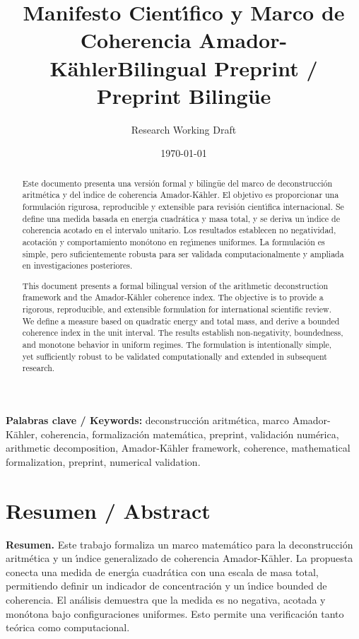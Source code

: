 \documentclass[11pt]{article}
\title{Manifesto Cient\'{\i}fico y Marco de Coherencia Amador-K\"ahler\newline\vspace{0.5em}\large{Bilingual Preprint / Preprint Biling\"ue}}
\author{Research Working Draft}
\date{\today}
\begin{document}
\maketitle

\begin{abstract}
Este documento presenta una versi\'on formal y biling\"ue del marco de deconstrucci\'on aritm\'etica y del \'{\i}ndice de coherencia Amador-K\"ahler. El objetivo es proporcionar una formulaci\'on rigurosa, reproducible y extensible para revisi\'on cient\'{\i}fica internacional. Se define una medida basada en energ\'{\i}a cuadr\'atica y masa total, y se deriva un \'{\i}ndice de coherencia acotado en el intervalo unitario. Los resultados establecen no negatividad, acotaci\'on y comportamiento mon\'otono en reg\'{\i}menes uniformes. La formulaci\'on es simple, pero suficientemente robusta para ser validada computacionalmente y ampliada en investigaciones posteriores.

This document presents a formal bilingual version of the arithmetic deconstruction framework and the Amador-K\"ahler coherence index. The objective is to provide a rigorous, reproducible, and extensible formulation for international scientific review. We define a measure based on quadratic energy and total mass, and derive a bounded coherence index in the unit interval. The results establish non-negativity, boundedness, and monotone behavior in uniform regimes. The formulation is intentionally simple, yet sufficiently robust to be validated computationally and extended in subsequent research.
\end{abstract}

\noindent\textbf{Palabras clave / Keywords:} deconstrucci\'on aritm\'etica, marco Amador-K\"ahler, coherencia, formalizaci\'on matem\'atica, preprint, validaci\'on num\'erica, arithmetic decomposition, Amador-K\"ahler framework, coherence, mathematical formalization, preprint, numerical validation.

\section*{Resumen / Abstract}
\textbf{Resumen.} Este trabajo formaliza un marco matem\'atico para la deconstrucci\'on aritm\'etica y un \'{\i}ndice generalizado de coherencia Amador-K\"ahler. La propuesta conecta una medida de energ\'{\i}a cuadr\'atica con una escala de masa total, permitiendo definir un indicador de concentraci\'on y un \'{\i}ndice bounded de coherencia. El an\'alisis demuestra que la medida es no negativa, acotada y mon\'otona bajo configuraciones uniformes. Esto permite una verificaci\'on tanto te\'orica como computacional.
\end{document}
